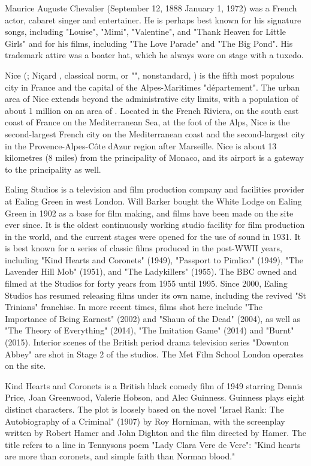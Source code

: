 \documentclass{article} \usepackage{iclr2019_conference,times}
\begin{document}
Maurice Auguste Chevalier (September 12, 1888  January 1, 1972) was a French actor, cabaret singer and entertainer. He is perhaps best known for his signature songs, including "Louise", "Mimi", "Valentine", and "Thank Heaven for Little Girls" and for his films, including "The Love Parade" and "The Big Pond". His trademark attire was a boater hat, which he always wore on stage with a tuxedo.

Nice (; Niçard , classical norm, or "", nonstandard,  ) is the fifth most populous city in France and the capital of the Alpes-Maritimes "département". The urban area of Nice extends beyond the administrative city limits, with a population of about 1 million on an area of . Located in the French Riviera, on the south east coast of France on the Mediterranean Sea, at the foot of the Alps, Nice is the second-largest French city on the Mediterranean coast and the second-largest city in the Provence-Alpes-Côte dAzur region after Marseille. Nice is about 13 kilometres (8 miles) from the principality of Monaco, and its airport is a gateway to the principality as well.

Ealing Studios is a television and film production company and facilities provider at Ealing Green in west London. Will Barker bought the White Lodge on Ealing Green in 1902 as a base for film making, and films have been made on the site ever since. It is the oldest continuously working studio facility for film production in the world, and the current stages were opened for the use of sound in 1931. It is best known for a series of classic films produced in the post-WWII years, including "Kind Hearts and Coronets" (1949), "Passport to Pimlico" (1949), "The Lavender Hill Mob" (1951), and "The Ladykillers" (1955). The BBC owned and filmed at the Studios for forty years from 1955 until 1995. Since 2000, Ealing Studios has resumed releasing films under its own name, including the revived "St Trinians" franchise. In more recent times, films shot here include "The Importance of Being Earnest" (2002) and "Shaun of the Dead" (2004), as well as "The Theory of Everything" (2014), "The Imitation Game" (2014) and "Burnt" (2015). Interior scenes of the British period drama television series "Downton Abbey" are shot in Stage 2 of the studios. The Met Film School London operates on the site.

Kind Hearts and Coronets is a British black comedy film of 1949 starring Dennis Price, Joan Greenwood, Valerie Hobson, and Alec Guinness. Guinness plays eight distinct characters. The plot is loosely based on the novel "Israel Rank: The Autobiography of a Criminal" (1907) by Roy Horniman, with the screenplay written by Robert Hamer and John Dighton and the film directed by Hamer. The title refers to a line in Tennysons poem "Lady Clara Vere de Vere": "Kind hearts are more than coronets, and simple faith than Norman blood."
\end{document}
